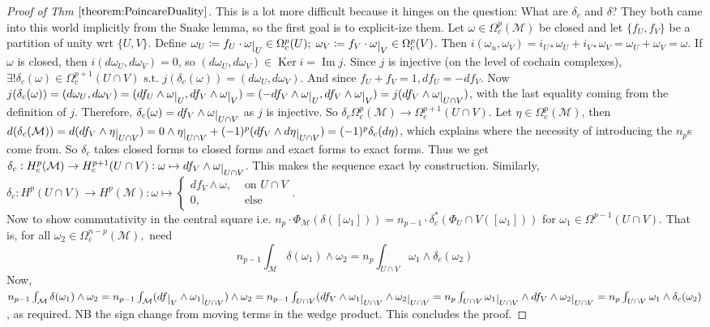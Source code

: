 \documentclass[10pt]{article}
\theoremstyle{plain}
\theoremstyle{definition}
\newcommand{\st}{\text{ s.t. }}
\newcommand{\man}{\mathcal{M}}
\newcommand{\compactpformman}[1]{\Omega^{#1}_c(\man)}
\newcommand{\deriv}{d}
\newcommand{\df}{df}
\newcommand{\dw}{d\omega}
\newcommand{\deta}{\deriv\eta}
\def\restrict#1{\raise-.5ex\hbox{\ensuremath|}_{#1}}
\DeclareMathOperator{\Ker}{Ker}
\DeclareMathOperator{\Ima}{Im}
\newcommand{\cohomman}[1]{H^{#1}(\man)}
\newcommand{\compactcohomman}[1]{H_c^{#1}(\man)}
\newcommand{\UintV}{U\cap V}
\begin{document}
\begin{proof}[Proof of Thm $\ref{theorem:PoincareDuality}$]
This is a lot more difficult because it hinges on the question: What are $\delta_c$ and $\delta$? They both came into this world implicitly from the Snake lemma, so the first goal is to explicit-ize them. Let $\omega\in \compactpformman{p} $ be closed and let $\{f_U,f_V\}$ be a partition of unity wrt $\{U,V\}$. Define $\omega_U \coloneqq f_U \cdot \omega\restrict{U} \in \Omega_c^p(U) ;\;  \omega_V \coloneqq f_V \cdot \omega\restrict{V} \in \Omega_c^p(V) $. Then $i(\omega_u,\omega_V) = i_{U*}\omega_U + i_{V*}\omega_V = \omega_U + \omega_V = \omega.$ If $\omega$ is closed, then $i(\dw_U,\dw_V) = 0$, so $(\dw_U,\dw_V) \in \Ker i = \Ima j$. Since $j$ is injective (on the level of cochain complexes), $\exists ! \delta_c(\omega) \in \Omega_c^{p+1} (\UintV) \st j(\delta_c(\omega)) = (\dw_U,\dw_V)$. And since $f_U + f_V = 1, \df_U = -\df_V$. Now $j(\delta_c(\omega)) = (\dw_U,\dw_V) = (\df_U \wedge \omega\restrict{U} , \df_V\wedge \omega\restrict{V}) = (-\df_V \wedge \omega\restrict{U} , \df_V\wedge \omega\restrict{V}) = j(\df_V \wedge \omega\restrict{\UintV})$, with the last equality coming from the definition of $j$. Therefore, $\delta_c(\omega) = \df_V \wedge \omega\restrict{\UintV}$ as $j$ is injective. So $\delta_c \Omega_c^p(\man) \to \Omega_c^{p+1}(\UintV).$ Let $\eta \in \Omega_c^p(\man)$, then $\deriv(\delta_c(\man)) = \deriv(\df_V \wedge \eta\restrict{\UintV}) = 0 \wedge \eta\restrict{\UintV} + (-1)^p (\df_V \wedge \deta \restrict{\UintV}) = (-1)^p\delta_c(\deta)$, which explains where the necessity of introducing the $n_p$s come from. So $\delta_c$ takes closed forms to closed forms and exact forms to exact forms. Thus we get $\delta_c : \compactcohomman{p} \to H^{p+1}_c(\UintV) : \omega\mapsto \df_V \wedge \omega\restrict{\UintV} $. This makes the sequence exact by construction. Similarly, $\delta_c : H^p(\UintV) \to \cohomman{p} : \omega \mapsto \begin{cases} \df_V\wedge \omega,& \text{ on } \UintV \\ 0, & \text{ else}\end{cases}$.
\\
Now to show commutativity in the central square i.e. $n_p \cdot \Phi_\man ( \delta([\omega_1])) = n_{p-1}\cdot \delta_c^* (\Phi_\UintV([\omega_1]))$ for $\omega_1 \in \Omega^{p-1}(\UintV)$. That is, for all $\omega_2 \in \Omega_c^{n-p}(\man),$ need 
$$
n_{p-1} \int_\man \delta(\omega_1) \wedge \omega_2 = n_p \int_{\UintV} \omega_1 \wedge \delta_c(\omega_2)
$$
Now, $n_{p-1} \int_\man \delta(\omega_1)\wedge\omega_2 = n_{p-1} \int_\man (\df\restrict{V} \wedge \omega_1 \restrict{\UintV}) \wedge\omega_2 = n_{p-1} \int_{\UintV} (\df_V \wedge \omega_1 \restrict{\UintV} \wedge \omega_2 \restrict{\UintV} = n_p \int_{\UintV} \omega_1 \restrict{\UintV} \wedge \df _V \wedge \omega_2 \restrict{\UintV} = n_p \int_{\UintV} \omega_1 \wedge \delta_c(\omega_2)$, as required. NB the sign change from moving terms in the wedge product. This concludes the proof.
\end{proof}
\end{document}
